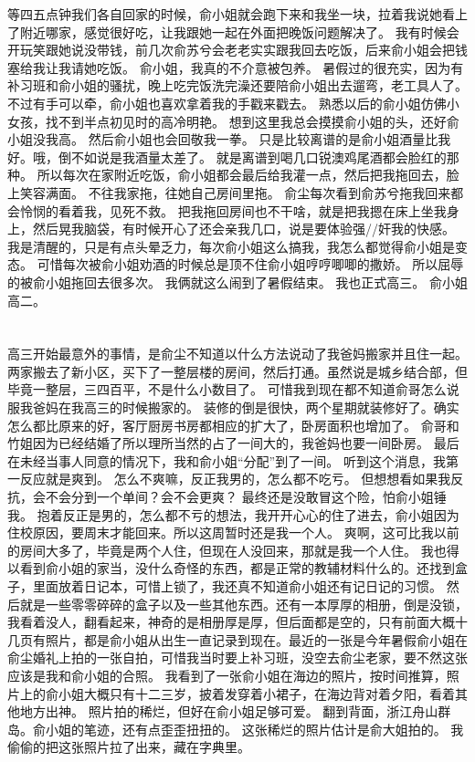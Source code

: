 等四五点钟我们各自回家的时候，俞小姐就会跑下来和我坐一块，拉着我说她看上了附近哪家，感觉很好吃，让我跟她一起在外面把晚饭问题解决了。
我有时候会开玩笑跟她说没带钱，前几次俞苏兮会老老实实跟我回去吃饭，后来俞小姐会把钱塞给我让我请她吃饭。
俞小姐，我真的不介意被包养。
暑假过的很充实，因为有补习班和俞小姐的骚扰，晚上吃完饭洗完澡还要陪俞小姐出去遛弯，老工具人了。
不过有手可以牵，俞小姐也喜欢拿着我的手戳来戳去。
熟悉以后的俞小姐仿佛小女孩，找不到半点初见时的高冷明艳。
想到这里我总会摸摸俞小姐的头，还好俞小姐没我高。
然后俞小姐也会回敬我一拳。
只是比较离谱的是俞小姐酒量比我好。哦，倒不如说是我酒量太差了。
就是离谱到喝几口锐澳鸡尾酒都会脸红的那种。
所以每次在家附近吃饭，俞小姐都会最后给我灌一点，然后把我拖回去，脸上笑容满面。
不往我家拖，往她自己房间里拖。
俞尘每次看到俞苏兮拖我回来都会怜悯的看着我，见死不救。
把我拖回房间也不干啥，就是把我摁在床上坐我身上，然后晃我脑袋，有时候开心了还会亲我几口，说是要体验强//奸我的快感。
我是清醒的，只是有点头晕乏力，每次俞小姐这么搞我，我怎么都觉得俞小姐是变态。
可惜每次被俞小姐劝酒的时候总是顶不住俞小姐哼哼唧唧的撒娇。
所以屈辱的被俞小姐拖回去很多次。
我俩就这么闹到了暑假结束。
我也正式高三。
俞小姐高二。

\chapter{}
高三开始最意外的事情，是俞尘不知道以什么方法说动了我爸妈搬家并且住一起。
两家搬去了新小区，买下了一整层楼的房间，然后打通。虽然说是城乡结合部，但毕竟一整层，三四百平，不是什么小数目了。
可惜我到现在都不知道俞哥怎么说服我爸妈在我高三的时候搬家的。
装修的倒是很快，两个星期就装修好了。确实怎么都比原来的好，客厅厨房书房都相应的扩大了，卧房面积也增加了。
俞哥和竹姐因为已经结婚了所以理所当然的占了一间大的，我爸妈也要一间卧房。
最后在未经当事人同意的情况下，我和俞小姐“分配”到了一间。
听到这个消息，我第一反应就是爽到。 怎么不爽嘛，反正我男的，怎么都不吃亏。
但想想看如果我反抗，会不会分到一个单间？会不会更爽？
最终还是没敢冒这个险，怕俞小姐锤我。
抱着反正是男的，怎么都不亏的想法，我开开心心的住了进去，俞小姐因为住校原因，要周末才能回来。所以这周暂时还是我一个人。
爽啊，这可比我以前的房间大多了，毕竟是两个人住，但现在人没回来，那就是我一个人住。
我也得以看到俞小姐的家当，没什么奇怪的东西，都是正常的教辅材料什么的。还找到盒子，里面放着日记本，可惜上锁了，我还真不知道俞小姐还有记日记的习惯。
然后就是一些零零碎碎的盒子以及一些其他东西。还有一本厚厚的相册，倒是没锁，我看着没人，翻看起来，神奇的是相册厚是厚，但后面都是空的，只有前面大概十几页有照片，都是俞小姐从出生一直记录到现在。最近的一张是今年暑假俞小姐在俞尘婚礼上拍的一张自拍，可惜我当时要上补习班，没空去俞尘老家，要不然这张应该是我和俞小姐的合照。
我看到了一张俞小姐在海边的照片，按时间推算，照片上的俞小姐大概只有十二三岁，披着发穿着小裙子，在海边背对着夕阳，看着其他地方出神。
照片拍的稀烂，但好在俞小姐足够可爱。
翻到背面，浙江舟山群岛。俞小姐的笔迹，还有点歪歪扭扭的。
这张稀烂的照片估计是俞大姐拍的。
我偷偷的把这张照片拉了出来，藏在字典里。

